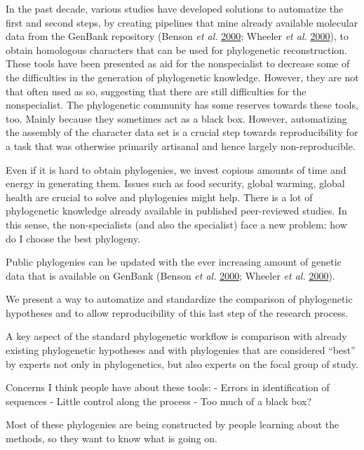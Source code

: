 \documentclass[]{article}
\begin{document}
In the past decade, various studies have developed solutions to automatize the first and second steps, by creating
pipelines that mine already available molecular data from the GenBank repository (Benson \emph{et al.} \protect\hyperlink{ref-benson2000genbank}{2000}; Wheeler \emph{et al.} \protect\hyperlink{ref-wheeler2000database}{2000}),
to obtain homologous characters that can be used for phylogenetic reconstruction.
These tools have been presented as aid for the nonspecialist to decrease some of
the difficulties in the generation of phylogenetic knowledge. However, they are
not that often used as so, suggesting that there are still difficulties for the nonspecialist.
The phylogenetic community has some reserves towards these tools, too. Mainly because they sometimes act as a black box.
However, automatizing the assembly of the character data set is a crucial step towards
reproducibility for a task that was otherwise primarily artisanal and hence largely
non-reproducible.

Even if it is hard to obtain phylogenies, we invest copious amounts of time and energy in generating them.
Issues such as food security, global warming, global health are crucial to solve and phylogenies might help.
There is a lot of phylogenetic knowledge already available in published peer-reviewed studies.
In this sense, the non-specialists (and also the specialist) face a new problem: how do I choose the best phylogeny.

Public phylogenies can be updated with the ever increasing amount of genetic data that is available on GenBank (Benson \emph{et al.} \protect\hyperlink{ref-benson2000genbank}{2000}; Wheeler \emph{et al.} \protect\hyperlink{ref-wheeler2000database}{2000}).

We present a way to automatize and standardize the comparison of phylogenetic hypotheses and to allow reproducibility of this last step of the research process.

A key aspect of the standard phylogenetic workflow is comparison with already existing
phylogenetic hypotheses and with phylogenies that are considered ``best'' by experts
not only in phylogenetics, but also experts on the focal group of study.

Concerns I think people have about these tools:
- Errors in identification of sequences
- Little control along the process
- Too much of a black box?

Most of these phylogenies are being constructed by people learning about the methods,
so they want to know what is going on.
\end{document}
